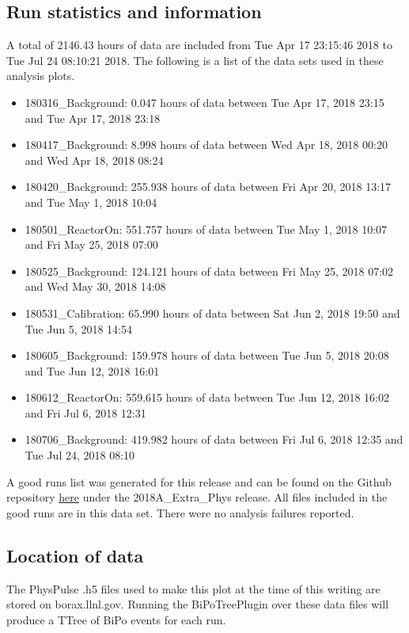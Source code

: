 \subsection{Run statistics and information}
A total of 2146.43 hours of data are included from Tue Apr 17 23:15:46 2018 to Tue Jul 24 08:10:21 2018. The following is a list of the data sets used in these analysis plots. 
\begin{itemize}
\item{180316\_Background: 0.047 hours of data between Tue Apr 17, 2018 23:15 and Tue Apr 17, 2018 23:18}
\item{180417\_Background: 8.998 hours of data between Wed Apr 18, 2018 00:20 and Wed Apr 18, 2018 08:24}
\item{180420\_Background: 255.938 hours of data between Fri Apr 20, 2018 13:17 and Tue May 1, 2018 10:04}
\item{180501\_ReactorOn: 551.757 hours of data between Tue May 1, 2018 10:07 and Fri May 25, 2018 07:00}
\item{180525\_Background: 124.121 hours of data between Fri May 25, 2018 07:02 and Wed May 30, 2018 14:08}
\item{180531\_Calibration: 65.990 hours of data between Sat Jun 2, 2018 19:50 and Tue Jun 5, 2018 14:54}
\item{180605\_Background: 159.978 hours of data between Tue Jun 5, 2018 20:08 and Tue Jun 12, 2018 16:01}
\item{180612\_ReactorOn: 559.615 hours of data between Tue Jun 12, 2018 16:02 and Fri Jul 6, 2018 12:31}
\item{180706\_Background: 419.982 hours of data between Fri Jul 6, 2018 12:35 and Tue Jul 24, 2018 08:10}
\end{itemize}
A good runs list was generated for this release and can be found on the Github repository  \href{https://github.com/PROSPECT-collaboration/PROSPECT2x_Analysis/tree/master/Analysis/AnalyzerConfig/NuFact18\_GoodRuns\_RxStat.txt}{here} under the 2018A\_Extra\_Phys release. All files included in the good runs are in this data set. There were no analysis failures reported.
\subsection{Location of data}
The PhysPulse .h5 files used to make this plot at the time of this writing are stored on borax.llnl.gov. Running the BiPoTreePlugin over these data files will produce a TTree of BiPo events for each run. 

